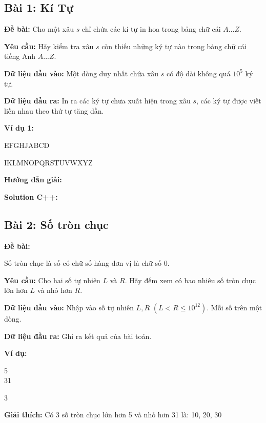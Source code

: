 \documentclass[12pt]{scrartcl}  %
\begin{document}
\subsection{Bài 1: Kí Tự}
\textbf{Đề bài:}
Cho một xâu $s$ chỉ chứa các kí tự in hoa trong bảng chữ cái $A...Z$.

\textbf{Yêu cầu:}
Hãy kiểm tra xâu $s$ còn thiếu những ký tự nào trong bảng chữ cái tiếng Anh $A...Z$.

\textbf{Dữ liệu đầu vào:}
Một dòng duy nhất chứa xâu $s$ có độ dài không quá $10^5$ ký tự.

\textbf{Dữ liệu đầu ra:}
In ra các ký tự chưa xuất hiện trong xâu $s$, các ký tự được viết liền nhau theo thứ tự tăng dần.

\textbf{Ví dụ 1:}
\begin{tcolorbox}[colback=gray!5!white, colframe=blue!50!black, title=Input]
EFGHJABCD
\end{tcolorbox}
\begin{tcolorbox}[colback=gray!5!white, colframe=green!50!black, title=Output]
IKLMNOPQRSTUVWXYZ
\end{tcolorbox}

\textbf{Hướng dẫn giải:}

\textbf{Solution C++:}

\subsection{Bài 2: Số tròn chục}
\textbf{Đề bài:}

Số tròn chục là số có chữ số hàng đơn vị là chữ số $0$.

\textbf{Yêu cầu:}
Cho hai số tự nhiên $L$ và $R$. Hãy đếm xem có bao nhiêu số tròn chục lớn hơn $L$ và nhỏ hơn $R$.

\textbf{Dữ liệu đầu vào:}
Nhập vào số tự nhiên $L, R$ $(L < R \leq 10^{12})$. Mỗi số trên một dòng.

\textbf{Dữ liệu đầu ra:}
Ghi ra kết quả của bài toán.

\textbf{Ví dụ:}
\begin{tcolorbox}[colback=gray!5!white, colframe=blue!50!black, title=Input]
5\\
31
\end{tcolorbox}
\begin{tcolorbox}[colback=gray!5!white, colframe=green!50!black, title=Output]
3
\end{tcolorbox}

\textbf{Giải thích:}
Có 3 số tròn chục lớn hơn 5 và
nhỏ hơn 31 là: 10, 20, 30
\end{document}
